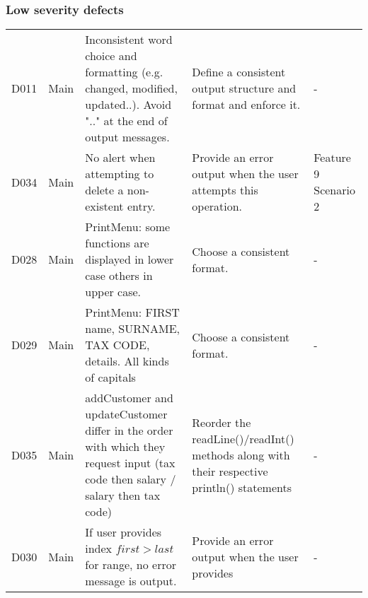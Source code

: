 \subsubsection{Low severity defects}
\begin{table}[H]
\footnotesize 
\begin{tabularx}{\textwidth}{| c | P | X | X | P |}
\hline %
 &  &  &  &  \\
\hline %
D011 
& Main 
& Inconsistent word choice and formatting (e.g. changed, modified, updated..). Avoid ".." at the end of output messages.
& Define a consistent output structure and format and enforce it. 
& - \\
\hline %
D034 
& Main
& No alert when attempting to delete a non-existent entry. 
& Provide an error output when the user attempts this operation. 
& Feature 9 Scenario 2\\
\hline %
D028 
& Main
& PrintMenu: some functions are displayed in lower case others in upper case.  
& Choose a consistent format. 
& -\\
\hline %
D029 
& Main
& PrintMenu: FIRST name, SURNAME, TAX CODE, details. All kinds of capitals  
& Choose a consistent format. 
& -\\
\hline %
D035 
& Main
& addCustomer and updateCustomer differ in the order with which they request input (tax code then salary / salary then tax code) 
& Reorder the readLine()/readInt() methods along with their respective println() statements
& -\\
\hline %
D030 
& Main 
& If user provides index $first > last$ for range, no error message is output. 
& Provide an error output when the user provides 
& -\\

\end{tabularx}
\end{table}
